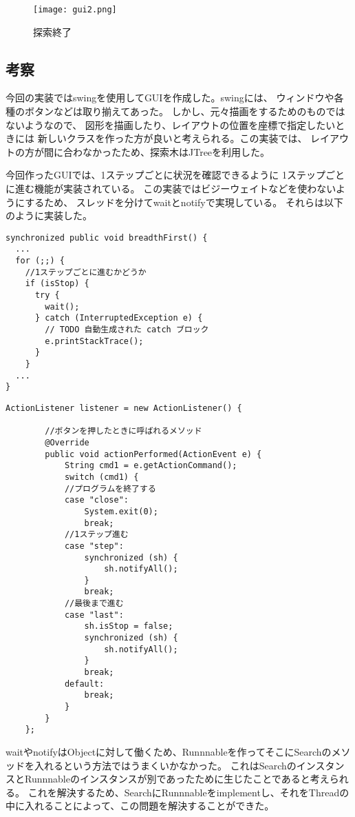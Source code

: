 \documentclass{jarticle}
\begin{document}
\begin{figure}[!hbt]
  \centering
  \texttt{[image: gui2.png]}
  \caption{探索終了}
  \label{fig:gui2}
\end{figure}
\subsection{考察}
今回の実装ではswingを使用してGUIを作成した。swingには、
ウィンドウや各種のボタンなどは取り揃えてあった。
しかし、元々描画をするためのものではないようなので、
図形を描画したり、レイアウトの位置を座標で指定したいときには
新しいクラスを作った方が良いと考えられる。この実装では、
レイアウトの方が間に合わなかったため、探索木はJTreeを利用した。

今回作ったGUIでは、1ステップごとに状況を確認できるように
1ステップごとに進む機能が実装されている。
この実装ではビジーウェイトなどを使わないようにするため、
スレッドを分けてwaitとnotifyで実現している。
それらは以下のように実装した。
\begin{lstlisting}[caption=wait部分,label=src:wait]
synchronized public void breadthFirst() {
  ...
  for (;;) {
    //1ステップごとに進むかどうか
    if (isStop) {
      try {
        wait();
      } catch (InterruptedException e) {
        // TODO 自動生成された catch ブロック
        e.printStackTrace();
      }
    }
  ...
}
\end{lstlisting}

\begin{lstlisting}[caption=notify部分,label=src:notify]
    ActionListener listener = new ActionListener() {

        //ボタンを押したときに呼ばれるメソッド
        @Override
        public void actionPerformed(ActionEvent e) {
            String cmd1 = e.getActionCommand();
            switch (cmd1) {
            //プログラムを終了する
            case "close":
                System.exit(0);
                break;
            //1ステップ進む
            case "step":
                synchronized (sh) {
                    sh.notifyAll();
                }
                break;
            //最後まで進む
            case "last":
                sh.isStop = false;
                synchronized (sh) {
                    sh.notifyAll();
                }
                break;
            default:
                break;
            }
        }
    };
\end{lstlisting}

waitやnotifyはObjectに対して働くため、Runnnableを作ってそこにSearchのメソッドを入れるという方法ではうまくいかなかった。
これはSearchのインスタンスとRunnnableのインスタンスが別であったために生じたことであると考えられる。
これを解決するため、SearchにRunnnableをimplementし、それをThreadの中に入れることによって、この問題を解決することができた。
\end{document}
